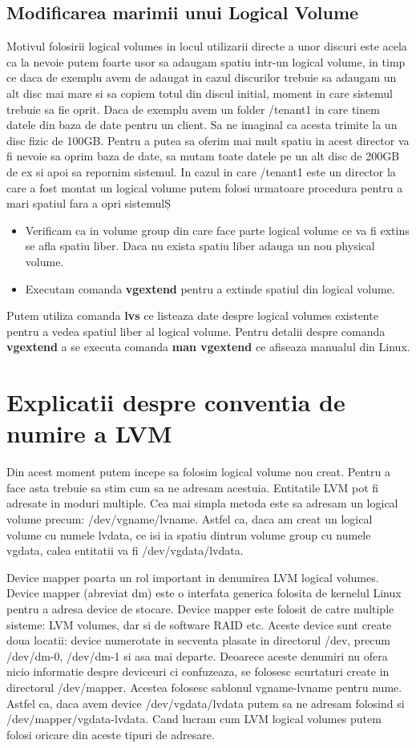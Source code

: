 \subsection{Modificarea marimii unui Logical Volume}
Motivul folosirii logical volumes in locul utilizarii directe a unor discuri este acela ca la nevoie putem foarte usor sa adaugam spatiu intr-un logical volume, in timp ce daca de exemplu avem de adaugat in cazul discurilor trebuie sa adaugam un alt disc mai mare si sa copiem totul din discul initial, moment in care sistemul trebuie sa fie oprit. Daca de exemplu avem un folder /tenant1 in care tinem datele din baza de date pentru un client. Sa ne imaginal ca acesta trimite la un disc fizic de 100GB. Pentru a putea sa oferim mai mult spatiu in acest director va fi nevoie sa oprim baza de date, sa mutam toate datele pe un alt disc de 200GB de ex si apoi sa repornim sistemul. In cazul in care /tenant1 este un director la care a fost montat un logical volume putem folosi urmatoare procedura pentru a mari spatiul fara a opri sistemulȘ
\begin{itemize}
\item Verificam ca in volume group din care face parte logical volume ce va fi extins se afla spatiu liber. Daca nu exista spatiu liber adauga un nou physical volume.
\item Executam comanda \textbf{vgextend} pentru a extinde spatiul din logical volume.
\end{itemize}
Putem utiliza comanda \textbf{lvs} ce listeaza date despre logical volumes existente pentru a vedea spatiul liber al logical volume. Pentru detalii despre comanda \textbf{vgextend} a se executa comanda \textbf{man vgextend} ce afiseaza manualul din Linux.
\newpage
\section{Explicatii despre conventia de numire a LVM}
Din acest moment putem incepe sa folosim logical volume nou creat. Pentru a face asta trebuie sa stim cum sa ne adresam acestuia. Entitatile LVM pot fi adresate in moduri multiple. Cea mai simpla metoda este sa adresam un logical volume precum: /dev/vgname/lvname. Astfel ca, daca am creat un logical volume cu numele lvdata, ce isi ia spatiu dintrun volume group cu numele vgdata, calea entitatii va fi /dev/vgdata/lvdata.
\par
Device mapper poarta un rol important in denumirea LVM logical volumes. Device mapper (abreviat dm) este o interfata generica folosita de kernelul Linux pentru a adresa device de stocare. Device mapper este folosit de catre multiple sisteme: LVM volumes, dar si de software RAID etc. Aceste device sunt create doua locatii: device numerotate in secventa plasate in directorul /dev, precum /dev/dm-0, /dev/dm-1 si asa mai departe. Deoarece aceste denumiri nu ofera nicio informatie despre deviceuri ci confuzeaza, se folosesc scurtaturi create in directorul /dev/mapper. Acestea folosesc sablonul vgname-lvname pentru nume. Astfel ca, daca avem device /dev/vgdata/lvdata putem sa ne adresam folosind si /dev/mapper/vgdata-lvdata. Cand lucram cum LVM logical volumes putem folosi oricare din aceste tipuri de adresare.